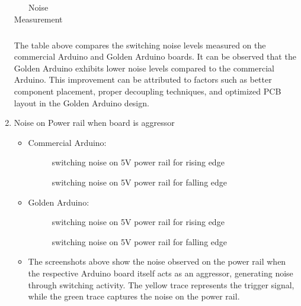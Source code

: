 \documentclass[a4paper,11pt]{article}%
\begin{document}
\begin{enumerate}
\begin{table}[H]
\begin{tabular}{ |l |c | c|}
				\hline\hline
			\end{tabular}
			\caption{Noise Measurement}
			\label{filterspecs}
		\end{table}
		
		
		The table above compares the switching noise levels measured on the commercial Arduino and Golden Arduino boards. It can be observed that the Golden Arduino exhibits lower noise levels compared to the commercial Arduino. This improvement can be attributed to factors such as better component placement, proper decoupling techniques, and optimized PCB layout in the Golden Arduino design.

	\item Noise on Power rail when board is aggressor
	      \begin{itemize}
		      \item Commercial Arduino:
		      \begin{figure}[H]
				\centering
				\caption{switching noise on 5V power rail for rising edge}
			\end{figure}

			\begin{figure}[H]
				\centering
				\caption{switching noise on 5V power rail for falling edge}
			\end{figure}
		           

		      \item Golden Arduino:
			  \begin{figure}[H]
				\centering
				\caption{switching noise on 5V power rail for rising edge}
			\end{figure}

			\begin{figure}[H]
				\centering
				\caption{switching noise on 5V power rail for falling edge}
			\end{figure}


		      \item The screenshots above show the noise observed on the power rail when the respective Arduino board itself acts as an aggressor, generating noise through switching activity. The yellow trace represents the trigger signal, while the green trace captures the noise on the power rail.
			           

\end{itemize}
\end{enumerate}
\end{document}
